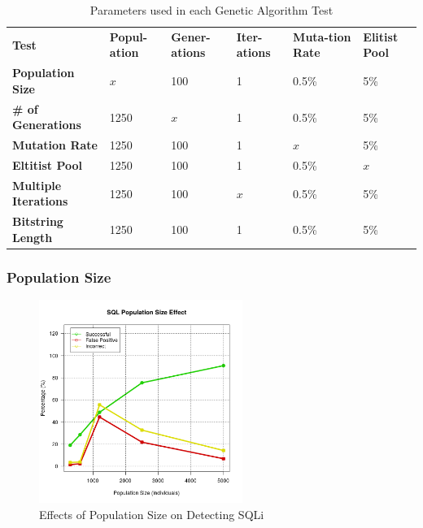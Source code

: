 \begin{table}[h]
	\centering
	\begin{tabular}{|p{1.5in}|p{0.675in}|p{0.675in}|p{0.675in}|p{0.675in}|p{0.675in}|}
	\hline
	\textbf{Test} & \textbf{Popul-ation} & \textbf{Gener-ations} & \textbf{Iter-ations} & \textbf{Muta-tion Rate} & \textbf{Elitist Pool} \\ 
	\hhline{|=|=|=|=|=|=|}
	\textbf{Population Size} & \textbf{$x$} & 100 & 1 & 0.5\% & 5\% \\
	\hline
	\textbf{\# of Generations} & 1250 & \textbf{$x$} & 1 & 0.5\% & 5\% \\
	\hline
	\textbf{Mutation Rate} & 1250 & 100 & 1 & \textbf{$x$} & 5\% \\
	\hline
	\textbf{Eltitist Pool} & 1250 & 100 & 1 & 0.5\% & \textbf{$x$} \\
	\hline
	\textbf{Multiple Iterations} & 1250 & 100 & \textbf{$x$} & 0.5\% & 5\% \\
	\hline
	\textbf{Bitstring Length} & 1250 & 100 & 1 & 0.5\% & 5\% \\
	\hline
	\end{tabular}
	\caption{Parameters used in each Genetic Algorithm Test}
	\label{tab:gaTestParameters}
\end{table}

\subsubsection{Population Size} \label{sec:resPopulation}

\begin{figure}
	\includegraphics[width=250px]{./assets/results/ga/pop/Results_SQL.png}
	\caption{Effects of Population Size on Detecting SQLi}
	\label{fig:resPopSize}
\end{figure}

